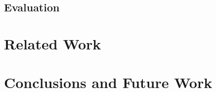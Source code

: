 \documentclass{llncs}
\newcommand{\othertm}{\textsuperscript{$\star$}}
\begin{document}
\subsection{Evaluation}
\label{sec:results}
 
%

%

%

\section{Related Work}
\label{sec:related}

\section{Conclusions and Future Work}
\label{sec:conclusion}


%

\small{


}
\end{document}
